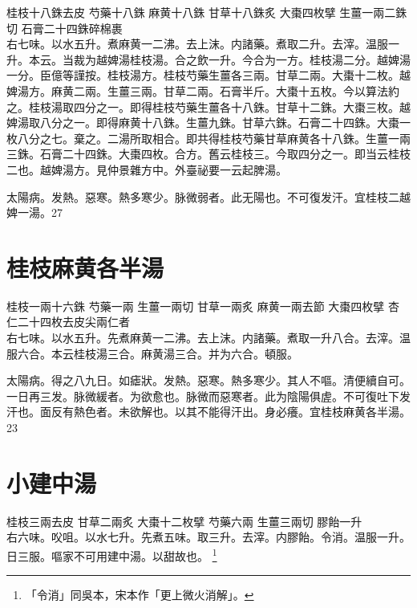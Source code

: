 桂枝{\scriptsize 十八銖去皮} 芍藥{\scriptsize 十八銖} 麻黄{\scriptsize 十八銖} 甘草{\scriptsize 十八銖炙} 大棗{\scriptsize 四枚擘} 生薑{\scriptsize 一兩二銖切} 石膏{\scriptsize 二十四銖碎棉裹}\\
右七味。以水五升。煮麻黄一二沸。去上沫。内諸藥。煮取二升。去滓。温服一升。本云。当裁为越婢湯桂枝湯。合{\khaaitp 之}飲一升。今合为一方。桂枝湯二分。越婢湯一分。{\scriptsize 臣億等謹按。桂枝湯方。桂枝芍藥生薑各三兩。甘草二兩。大棗十二枚。越婢湯方。麻黄二兩。生薑三兩。甘草二兩。石膏半斤。大棗十五枚。今以算法約之。桂枝湯取四分之一。即得桂枝芍藥生薑各十八銖。甘草十二銖。大棗三枚。越婢湯取八分之一。即得麻黄十八銖。生薑九銖。甘草六銖。石膏二十四銖。大棗一枚八分之七。棄之。二湯所取相合。即共得桂枝芍藥甘草麻黄各十八銖。生薑一兩三銖。石膏二十四銖。大棗四枚。合方。舊云桂枝三。今取四分之一。即当云桂枝二也。越婢湯方。見仲景雜方中。外臺祕要一云起脾湯。}

太陽病。发熱。惡寒。熱多寒少。脉微弱者。此无陽也。不可{\khaaitp 復}发汗。{\khaaitp 宜桂枝二越婢一湯。}27

\section{桂枝麻黄各半湯}

桂枝{\scriptsize 一兩十六銖} 芍藥{\scriptsize 一兩} 生薑{\scriptsize 一兩切} 甘草{\scriptsize 一兩炙} 麻黄{\scriptsize 一兩去節} 大棗{\scriptsize 四枚擘} 杏仁{\scriptsize 二十四枚去皮尖兩仁者}\\
右七味。以水五升。先煮麻黄一二沸。去上沫。内諸藥。煮取一升八合。去滓。温服六合。本云桂枝湯三合。麻黄湯三合。并为六合。頓服。

太陽病。得之八九日。如瘧狀。发熱。惡寒。熱多寒少。其人不嘔。清便續自可。一日再三发。脉微緩者。为欲愈也。脉微而惡寒者。此为陰陽俱虗。不可復{\khaaitp 吐下}发汗也。面反有熱色者。未欲解也。以其不能得汗出。身必癢。宜桂枝麻黄各半湯。23

\section{小建中湯}

桂枝{\scriptsize 三兩去皮} 甘草{\scriptsize 二兩炙} 大棗{\scriptsize 十二枚擘} 芍藥{\scriptsize 六兩} 生薑{\scriptsize 三兩切} 膠飴{\scriptsize 一升}\\
右六味。{\khaaitp 㕮咀。}以水七升。{\khaaitp 先}煮{\khaaitp 五味。}取三升。去滓。内{\khaaitp 膠}飴。令消。温服一升。日三服。嘔家不可用建中湯。以甜故也。
	\footnote{
		「令消」同吳本，宋本作「更上微火消解」。
	}

